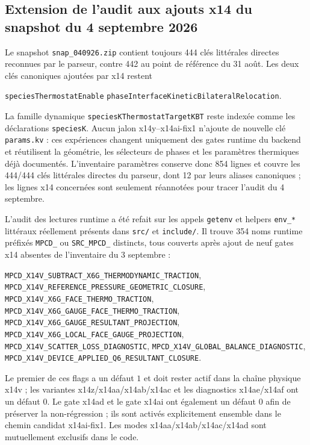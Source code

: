 \documentclass[11pt,a4paper]{article}
\begin{document}
\subsection{Extension de l'audit aux ajouts x14 du snapshot du 4 septembre 2026}

Le snapshot \nolinkurl{snap_040926.zip} contient toujours 444 clés littérales directes reconnues par le parseur, contre 442 au point de référence du 31 août. Les deux clés canoniques ajoutées par x14 restent
\begin{center}
\small
\nolinkurl{speciesThermostatEnable}
\qquad{}\qquad
\nolinkurl{phaseInterfaceKineticBilateralRelocation}.
\end{center}
La famille dynamique \nolinkurl{speciesKThermostatTargetKBT} reste indexée comme les déclarations \nolinkurl{speciesK}. Aucun jalon x14y--x14ai-fix1 n'ajoute de nouvelle clé \texttt{params.kv} : ces expériences changent uniquement des gates runtime du backend et réutilisent la géométrie, les sélecteurs de phases et les paramètres thermiques déjà documentés. L'inventaire paramètres conserve donc 854 lignes et couvre les 444/444 clés littérales directes du parseur, dont 12 par leurs aliases canoniques ; les lignes x14 concernées sont seulement réannotées pour tracer l'audit du 4 septembre.

L'audit des lectures runtime a été refait sur les appels \texttt{getenv} et helpers \texttt{env\_*} littéraux réellement présents dans \nolinkurl{src/} et \nolinkurl{include/}. Il trouve 354 noms runtime préfixés \nolinkurl{MPCD_} ou \nolinkurl{SRC_MPCD_} distincts, tous couverts après ajout de neuf gates x14 absentes de l'inventaire du 3 septembre :
\begin{center}
\begin{minipage}{0.94\textwidth}
\small\raggedright
\nolinkurl{MPCD_X14V_SUBTRACT_X6G_THERMODYNAMIC_TRACTION},\linebreak
\nolinkurl{MPCD_X14V_REFERENCE_PRESSURE_GEOMETRIC_CLOSURE},\linebreak
\nolinkurl{MPCD_X14V_X6G_FACE_THERMO_TRACTION},\linebreak
\nolinkurl{MPCD_X14V_X6G_GAUGE_FACE_THERMO_TRACTION},\linebreak
\nolinkurl{MPCD_X14V_X6G_GAUGE_RESULTANT_PROJECTION},\linebreak
\nolinkurl{MPCD_X14V_X6G_LOCAL_FACE_GAUGE_PROJECTION},\linebreak
\nolinkurl{MPCD_X14V_SCATTER_LOSS_DIAGNOSTIC},\linebreak
\nolinkurl{MPCD_X14V_GLOBAL_BALANCE_DIAGNOSTIC},\linebreak
\nolinkurl{MPCD_X14V_DEVICE_APPLIED_Q6_RESULTANT_CLOSURE}.
\end{minipage}
\end{center}
Le premier de ces flags a un défaut $1$ et doit rester actif dans la chaîne physique x14v ; les variantes x14z/x14aa/x14ab/x14ac et les diagnostics x14ae/x14af ont un défaut $0$. Le gate x14ad et le gate x14ai ont également un défaut $0$ afin de préserver la non-régression ; ils sont activés explicitement ensemble dans le chemin candidat x14ai-fix1. Les modes x14aa/x14ab/x14ac/x14ad sont mutuellement exclusifs dans le code.
\end{document}
